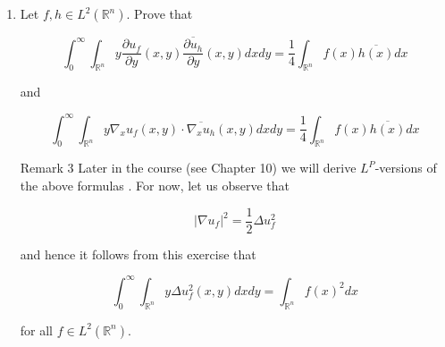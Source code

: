 \begin{enumerate}
\begin{proof}
	Hence
	\begin{align*}
		\| G_h(f) \|_2^2
		&= \int _0^\infty t \int _{\mathbb{R}^n} 4 \pi^2 |\xi|^2 \hat{H}_{2 t}(\xi) \left| \hat{f}(\xi) \right| ^2 d \xi dt \\
		&= \int_ {\mathbb{R}^n} 4 \pi^2 |\xi|^2 \left[
		\int _0^\infty t \hat{H}_{2 t}(\xi) d t \right] \left| \hat{f}(\xi) \right| ^2 d \xi \\
	\end{align*}
	We have
	\begin{align*}
		\int _0^\infty t \hat{H}_{2 t}(\xi) d t
		&= \int _0^\infty t e^{-4 \pi^2 (4 t^2) |\xi|^2} d t \\
		&= \frac{1}{32 \pi^2 |\xi|^2}
	\end{align*}
	Therefroe

	\[
		\| G_h(f) \|_2^2 = \frac{1}{8} \| f \|_2^2			
	.\]

		

\end{proof}

\item Let $f, h \in L^2\left(\mathbb{R}^n\right)$. Prove that

\[
\int_0^{\infty} \int_{\mathbb{R}^n} y \frac{\partial u_f}{\partial y}(x, y) \frac{\overline{\partial u_h}}{\partial y}(x, y) d x d y=\frac{1}{4} \int_{\mathbb{R}^n} f(x) \overline{h(x)} d x
\]

and

\[
\int_0^{\infty} \int_{\mathbb{R}^n} y \nabla_x u_f(x, y) \cdot \overline{\nabla_x u_h}(x, y) d x d y=\frac{1}{4} \int_{\mathbb{R}^n} f(x) \overline{h(x)} d x
\]


Remark 3 Later in the course (see Chapter 10) we will derive $L^P$-versions of the above formulas . For now, let us observe that

\[
\left|\nabla u_f\right|^2=\frac{1}{2} \Delta u_f^2
\]

and hence it follows from this exercise that

\[
\int_0^{\infty} \int_{\mathbb{R}^n} y \Delta u_f^2(x, y) d x d y=\int_{\mathbb{R}^n} f(x)^2 d x
\]

for all $f \in L^2\left(\mathbb{R}^n\right)$.


\end{enumerate}

